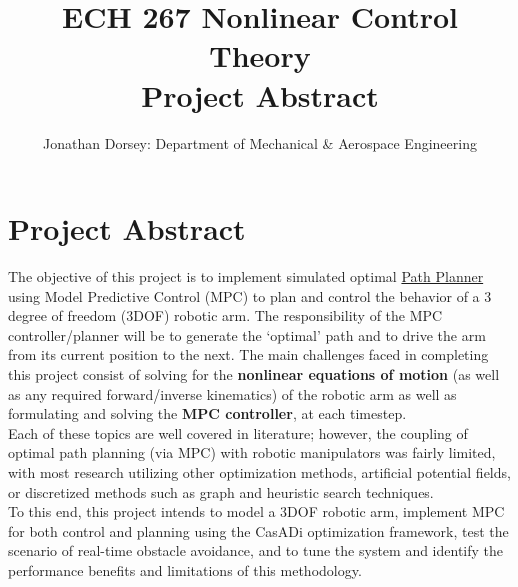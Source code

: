 \documentclass[12px]{article}
\begin{document}
    \title{ECH 267 Nonlinear Control Theory \\ Project Abstract }

    \author{Jonathan Dorsey: Department of Mechanical \& Aerospace Engineering}

    \maketitle


    \section*{Project Abstract}

    \indent The objective of this project is to implement simulated optimal \underline{Path Planner} using Model Predictive Control (MPC) to plan and control the behavior of a 3 degree of freedom (3DOF) robotic arm. The responsibility of the MPC controller/planner will be to generate the `optimal' path and to drive the arm from its current position to the next. The main challenges faced in completing this project consist of solving for the \textbf{nonlinear equations of motion} (as well as any required forward/inverse kinematics) of the robotic arm as well as formulating and solving the \textbf{MPC controller}, at each timestep. \\

     Each of these topics are well covered in literature; however, the coupling of optimal path planning (via MPC) with robotic manipulators was fairly limited, with most research utilizing other optimization methods, artificial potential fields, or discretized methods such as graph and heuristic search techniques. \\

    To this end, this project intends to model a 3DOF robotic arm, implement MPC for both control and planning using the CasADi optimization framework, test the scenario of real-time obstacle avoidance, and to tune the system and identify the performance benefits and limitations of this methodology.
\end{document}
